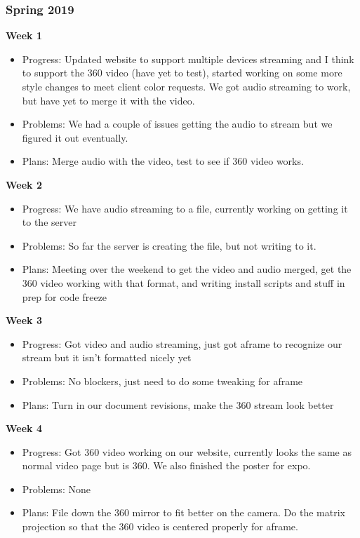 \documentclass[onecolumn, draftclsnofoot,10pt, compsoc]{IEEEtran}
\begin{document}
    \subsubsection{Spring 2019}
        \textbf{Week 1}
        \begin{itemize}
            \item Progress: Updated website to support multiple devices streaming and I think to support the 360 video (have yet to test), started working on some more style changes to meet client color requests. We got audio streaming to work, but have yet to merge it with the video.
            \item Problems: We had a couple of issues getting the audio to stream but we figured it out eventually.
            \item Plans: Merge audio with the video, test to see if 360 video works.
        \end{itemize}
        \textbf{Week 2}
        \begin{itemize}
            \item Progress: We have audio streaming to a file, currently working on getting it to the server
            \item Problems: So far the server is creating the file, but not writing to it.
            \item Plans: Meeting over the weekend to get the video and audio merged, get the 360 video working with that format, and writing install scripts and stuff in prep for code freeze
        \end{itemize}
        \textbf{Week 3}
        \begin{itemize}
            \item Progress: Got video and audio streaming, just got aframe to recognize our stream but it isn't formatted nicely yet

            \item Problems: No blockers, just need to do some tweaking for aframe

            \item Plans: Turn in our document revisions, make the 360 stream look better
        \end{itemize}
        \textbf{Week 4}
        \begin{itemize}
            \item Progress: Got 360 video working on our website, currently looks the same as normal video page but is 360. We also finished the poster for expo.

            \item Problems: None

            \item Plans: File down the 360 mirror to fit better on the camera. Do the matrix projection so that the 360 video is centered properly for aframe.
        \end{itemize}
\end{document}
